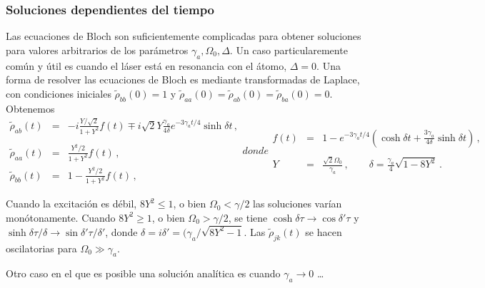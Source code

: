 \documentclass[12pt]{report}
\begin{document}
\subsubsection{Soluciones dependientes del tiempo} 
Las ecuaciones de Bloch son suficientemente complicadas para obtener 
soluciones para valores arbitrarios de los par\'ametros 
$\gamma_a,\Omega_0,\Delta$. Un caso particularemente com\'un y \'util 
es cuando el l\'aser est\'a en resonancia con el \'atomo, $\Delta =0$. Una 
forma de resolver las ecuaciones de Bloch es mediante transformadas de 
Laplace, con condiciones iniciales $\tilde{\rho}_{bb} (0) =1$ y 
$\tilde{\rho}_{aa} (0) = \tilde{\rho}_{ab} (0) = \tilde{\rho}_{ba} (0) = 0$. 
Obtenemos
%
\begin{subequations} 	%
\begin{eqnarray} 	
\tilde{\rho}_{ab}(t) &=& - i \frac{ Y/ \sqrt{2} }{1+Y^2}  f(t)
  \mp i \sqrt{2} Y \frac{\gamma_a}{4 \delta} e^{-3\gamma_a t/4} \sinh{\delta t}	
   \,,  	\nonumber \\   \\
%
\tilde{\rho}_{aa}(t) &=& \frac{ Y^2/2 }{1+ Y^2}  f(t)  \,, 	\\ 
%
\tilde{\rho}_{bb}(t) &=& 1 -\frac{ Y^2/2 }{1+ Y^2}   f(t)  \,, 
\end{eqnarray}
donde
%
\begin{eqnarray}
f(t) &=& 1 -e^{-3\gamma_a t/4} \left( \cosh{\delta t}  
	+ \frac{3 \gamma_a}{4 \delta} \sinh{\delta t} \right) \,, \nonumber \\ \\
Y &=& \frac{ \sqrt{2} \Omega_0 }{\gamma_a} 	\,, \qquad 
	\delta  = \frac{\gamma_a}{4} \sqrt{1 - 8Y^2} \,. 
\end{eqnarray}
\end{subequations} 

Cuando la excitaci\'on es d\'ebil, $ 8Y^2 \leq 1$, o bien 
$\Omega_0 < \gamma /2$ las soluciones var\'ian mon\'otonamente. 
Cuando $ 8Y^2 \geq 1$, o bien $\Omega_0 > \gamma /2$, se tiene 
$\cosh{\delta \tau} \to \cos{\delta' \tau}$ y 
$\sinh{\delta \tau}/\delta \to \sin{\delta' \tau}/\delta'$, donde 
$\delta = i \delta' = (\gamma_a /\sqrt{8Y^2 -1}$. Las $\tilde{\rho}_{jk}(t)$ 
se hacen oscilatorias para $\Omega_0 \gg \gamma_a$. 

Otro caso en el que es posible una soluci\'on anal\'itica es cuando 
$\gamma_a \to 0$ \ldots 

\end{document}
